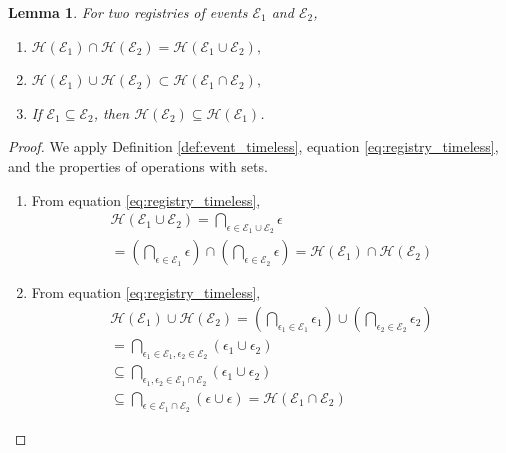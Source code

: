 \documentclass[12pt]{amsart}
\theoremstyle{definition}
\theoremstyle{plain}
\newtheorem{lemma}[definition]{Lemma}
\begin{document}
\begin{lemma}
\label{thm:properties_events}
For two registries of events $\mathcal E_1$ and $\mathcal E_2$,
\begin{enumerate}
	\item 
$\mathscr{H}(\mathcal E_1)\cap \mathscr{H}(\mathcal E_2)=\mathscr{H}(\mathcal E_1\cup \mathcal E_2),$
	\item 
$\mathscr{H}(\mathcal E_1) \cup \mathscr{H}(\mathcal E_2)\subset\mathscr{H}(\mathcal E_1\cap \mathcal E_2),$
	\item 
If $\mathcal E_1\subseteq \mathcal E_2$, then $\mathscr{H}(\mathcal E_2)\subseteq \mathscr{H}(\mathcal E_1)$.
\end{enumerate}
\end{lemma}
\begin{proof}
We apply Definition \ref{def:event_timeless}, equation \eqref{eq:registry_timeless}, and the properties of operations with sets.
\begin{enumerate}
	\item From equation \eqref{eq:registry_timeless},
\begin{equation}
\begin{array}{l}
\mathscr{H}(\mathcal E_1\cup \mathcal E_2)=\bigcap_{\epsilon\in\mathcal E_1\cup \mathcal E_2}\epsilon \\
= \left(\bigcap_{\epsilon\in\mathcal E_1}\epsilon\right) \cap \left(\bigcap_{\epsilon\in\mathcal E_2}\epsilon\right)=\mathscr{H}(\mathcal E_1)\cap \mathscr{H}(\mathcal E_2)
\end{array}
\end{equation}
	\item From equation \eqref{eq:registry_timeless},
\begin{equation}
\begin{array}{l}
\mathscr{H}(\mathcal E_1) \cup \mathscr{H}(\mathcal E_2) = \left(\bigcap_{\epsilon_1\in\mathcal E_1}\epsilon_1\right) \cup \left(\bigcap_{\epsilon_2\in\mathcal E_2}\epsilon_2\right) \\
= \bigcap_{\epsilon_1\in\mathcal E_1, \epsilon_2\in\mathcal E_2}\left(\epsilon_1\cup \epsilon_2\right) \\
\subseteq \bigcap_{\epsilon_1, \epsilon_2\in\mathcal E_1\cap\mathcal E_2}\left(\epsilon_1\cup \epsilon_2\right) \\
\subseteq \bigcap_{\epsilon\in\mathcal E_1\cap\mathcal E_2}\left(\epsilon \cup \epsilon \right)= \mathscr{H}(\mathcal E_1\cap \mathcal E_2)
\end{array}
\end{equation}

\end{enumerate}
\end{proof}
\end{document}
